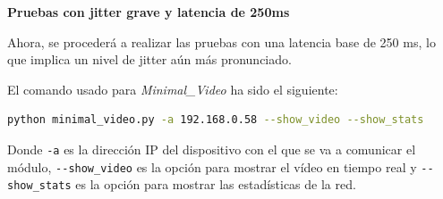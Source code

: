 \newpage

\textbf{Pruebas con jitter grave y latencia de 250ms}
\vspace{\baselineskip}

Ahora, se procederá a realizar las pruebas con una latencia base de 250 ms, lo que implica un nivel de jitter aún más pronunciado.
\vspace{\baselineskip}

El comando usado para \textit{Minimal\_Video} ha sido el siguiente:

\begin{lstlisting}[language=bash]
python minimal_video.py -a 192.168.0.58 --show_video --show_stats
\end{lstlisting}
Donde \verb|-a| es la dirección IP del dispositivo con el que se va a comunicar el módulo, \verb|--show_video| es la opción para mostrar el vídeo en tiempo real y \verb|--show_stats| es la opción para mostrar las estadísticas de la red.
\vspace{\baselineskip}

